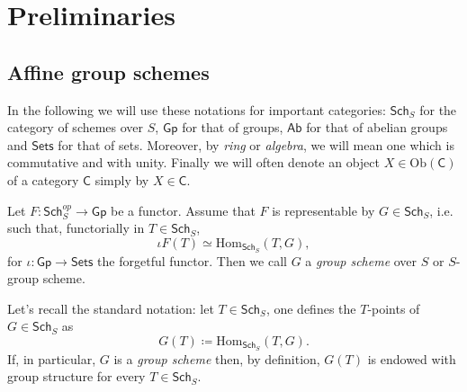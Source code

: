 \documentclass[../Main]{subfiles}
\begin{document}
\chapter{Preliminaries}
\section{Affine group schemes}
In the following we will use these notations for important categories:
$\mathsf{Sch}_{S}$ for the category of schemes over $S$,
$\mathsf{Gp}$ for that of groups,
$\mathsf{Ab}$ for that of abelian groups
and $\mathsf{Sets}$ for that of sets.
Moreover, by {\em ring} or {\em algebra}, we will mean one which is commutative and with unity.
Finally we will often denote an object $X \in \mathrm{Ob} \left(\mathsf{C}\right)$ 
of a category $\mathsf{C}$ simply by $X \in \mathsf{C}$.
\begin{defn}
	Let $F\colon \mathsf{Sch}_S^{op} \to \mathsf{Gp}$ be a functor.
	Assume that $F$ is representable by $G \in \mathsf{Sch}_{ S }$, i.e. such that, 
	functorially in $T \in \mathsf{Sch}_{ S }$,
	\begin{equation}
		\iota F(T) \simeq \mathrm{Hom}_{\mathsf{Sch}_S} \left( T, G \right)
	,\end{equation} 
	for $\iota\colon \mathsf{Gp} \to \mathsf{Sets}$ the forgetful functor.
	Then we call $G$ a {\em group scheme} over $S$
	or $S$-group scheme.
\end{defn}


\begin{rem}
	Let's recall the standard notation: let $T \in \mathsf{Sch}_{ S }$, one defines
	the $T$-points of $G \in \mathsf{Sch}_{ S }$ as
	\begin{equation}
		G(T) \coloneqq \mathrm{Hom}_{\mathsf{Sch}_{ S }} \left( T, G \right)
	.\end{equation} 
	If, in particular, $G$ is a {\em group scheme} then, by definition,
	$G(T)$ is endowed with group structure for every $T \in \mathsf{Sch}_{ S }$.
\end{rem}
\end{document}
